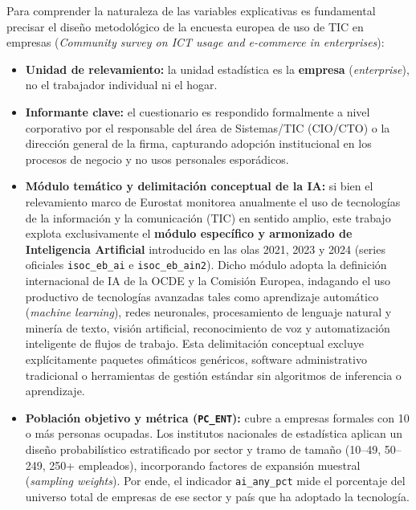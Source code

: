 \documentclass[12pt,a4paper]{article}
\begin{document}
Para comprender la naturaleza de las variables explicativas es fundamental precisar el diseño metodológico de la encuesta europea de uso de TIC en empresas (\textit{Community survey on ICT usage and e-commerce in enterprises}):

\begin{itemize}

    \item \textbf{Unidad de relevamiento:} la unidad estadística es la \textbf{empresa} (\textit{enterprise}), no el trabajador individual ni el hogar.

    \item \textbf{Informante clave:} el cuestionario es respondido formalmente a nivel corporativo por el responsable del área de Sistemas/TIC (CIO/CTO) o la dirección general de la firma, capturando adopción institucional en los procesos de negocio y no usos personales esporádicos.

    \item \textbf{Módulo temático y delimitación conceptual de la IA:} si bien el relevamiento marco de Eurostat monitorea anualmente el uso de tecnologías de la información y la comunicación (TIC) en sentido amplio, este trabajo explota exclusivamente el \textbf{módulo específico y armonizado de Inteligencia Artificial} introducido en las olas 2021, 2023 y 2024 (series oficiales \texttt{isoc\_eb\_ai} e \texttt{isoc\_eb\_ain2}). Dicho módulo adopta la definición internacional de IA de la OCDE y la Comisión Europea, indagando el uso productivo de tecnologías avanzadas tales como aprendizaje automático (\textit{machine learning}), redes neuronales, procesamiento de lenguaje natural y minería de texto, visión artificial, reconocimiento de voz y automatización inteligente de flujos de trabajo. Esta delimitación conceptual excluye explícitamente paquetes ofimáticos genéricos, software administrativo tradicional o herramientas de gestión estándar sin algoritmos de inferencia o aprendizaje.


    \item \textbf{Población objetivo y métrica (\texttt{PC\_ENT}):} cubre a empresas formales con 10 o más personas ocupadas. Los institutos nacionales de estadística aplican un diseño probabilístico estratificado por sector y tramo de tamaño (10--49, 50--249, 250+ empleados), incorporando factores de expansión muestral (\textit{sampling weights}). Por ende, el indicador \texttt{ai\_any\_pct} mide el porcentaje del universo total de empresas de ese sector y país que ha adoptado la tecnología.


\end{itemize}
\end{document}
